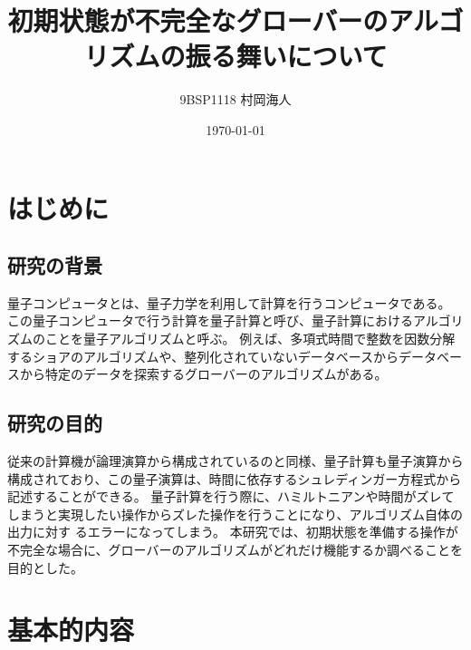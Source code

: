\documentclass[platex,dvipdfmx, titlepage]{jlreq}			%
\title{初期状態が不完全なグローバーのアルゴリズムの振る舞いについて}
\author{9BSP1118 村岡海人}
\date{\today}
\begin{document}
\maketitle
\tableofcontents
\clearpage

\makeatletter
\renewcommand{\theequation}{%
\thesection.\arabic{equation}}
\makeatother

\section{はじめに}
% 

\subsection{研究の背景}
量子コンピュータとは、量子力学を利用して計算を行うコンピュータである。
この量子コンピュータで行う計算を量子計算と呼び、量子計算におけるアルゴリズムのことを量子アルゴリズムと呼ぶ。
例えば、多項式時間で整数を因数分解するショアのアルゴリズムや、整列化されていないデータベースからデータベースから特定のデータを探索するグローバーのアルゴリズムがある。


\subsection{研究の目的}
従来の計算機が論理演算から構成されているのと同様、量子計算も量子演算から構成されており、この量子演算は、時間に依存するシュレディンガー方程式から記述することができる。
量子計算を行う際に、ハミルトニアンや時間がズレてしまうと実現したい操作からズレた操作を行うことになり、アルゴリズム自体の出力に対す るエラーになってしまう。
本研究では、初期状態を準備する操作が不完全な場合に、グローバーのアルゴリズムがどれだけ機能するか調べることを目的とした。

\section{基本的内容}



\end{document}
